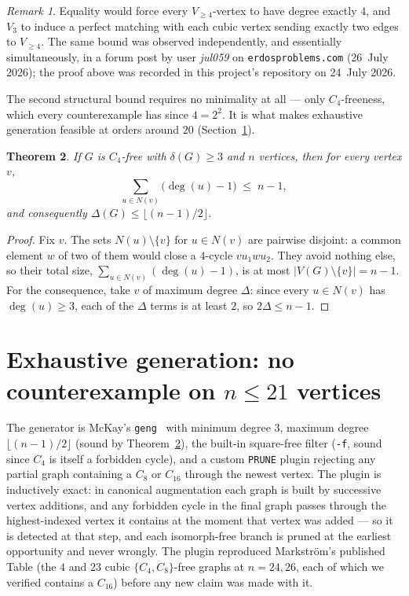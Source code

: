 \documentclass[11pt]{article}
\newtheorem{theorem}{Theorem}[section]
\theoremstyle{remark}
\newtheorem{remark}[theorem]{Remark}
\newcommand{\Cyc}[1]{C_{#1}}
\begin{document}
\begin{remark}
Equality would force every $V_{\ge4}$-vertex to have degree exactly $4$,
and $V_3$ to induce a perfect matching with each cubic vertex sending
exactly two edges to $V_{\ge4}$.
The same bound was observed independently, and essentially simultaneously,
in a forum post by user \emph{jul059} on \texttt{erdosproblems.com}
(26~July 2026); the proof above was recorded in this project's repository on
24~July 2026. %
\end{remark}

The second structural bound requires no minimality at all --- only
$\Cyc4$-freeness, which every counterexample has since $4 = 2^2$. It is what
makes exhaustive generation feasible at orders around $20$
(Section~\ref{sec:enum}).

\begin{theorem}\label{thm:degcap}
If $G$ is $\Cyc4$-free with $\delta(G) \ge 3$ and $n$ vertices, then for
every vertex $v$,
\[
\sum_{u \in N(v)} \bigl(\deg(u) - 1\bigr) \;\le\; n - 1,
\]
and consequently $\Delta(G) \le \lfloor (n-1)/2 \rfloor$.
\end{theorem}

\begin{proof}
Fix $v$. The sets $N(u)\setminus\{v\}$ for $u \in N(v)$ are pairwise
disjoint: a common element $w$ of two of them would close a $4$-cycle
$v u_1 w u_2$. They avoid nothing else, so their total size,
$\sum_{u\in N(v)}(\deg(u)-1)$, is at most $|V(G)\setminus\{v\}| = n-1$.
For the consequence, take $v$ of maximum degree $\Delta$: since every
$u \in N(v)$ has $\deg(u) \ge 3$, each of the $\Delta$ terms is at least
$2$, so $2\Delta \le n-1$.
\end{proof}

\section{Exhaustive generation: no counterexample on $n \le 21$ vertices}
\label{sec:enum}

The generator is McKay's \texttt{geng}~\cite{nauty} with minimum degree $3$,
maximum degree $\lfloor (n-1)/2 \rfloor$ (sound by
Theorem~\ref{thm:degcap}), the built-in square-free filter (\texttt{-f},
sound since $\Cyc4$ is itself a forbidden cycle), and a custom
\texttt{PRUNE} plugin rejecting any partial graph containing a $\Cyc8$ or
$\Cyc{16}$ through the newest vertex. The plugin is inductively exact: in
canonical augmentation each graph is built by successive vertex additions,
and any forbidden cycle in the final graph passes through the
highest-indexed vertex it contains at the moment that vertex was added ---
so it is detected at that step, and each isomorph-free branch is pruned at
the earliest opportunity and never wrongly. The plugin reproduced
Markstr\"om's published Table (the $4$ and $23$ cubic $\{\Cyc4,\Cyc8\}$-free
graphs at $n=24,26$, each of which we verified contains a $\Cyc{16}$) before
any new claim was made with it.
\end{document}

